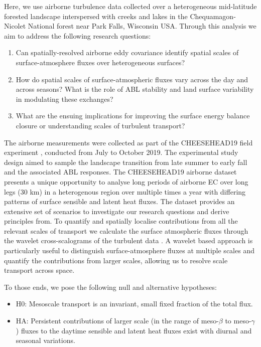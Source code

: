 \documentclass[draft]{agujournal2019}
\begin{document}
Here, we use airborne turbulence data collected over a heterogeneous mid-latitude forested landscape interspersed with creeks and lakes in the Chequamagon-Nicolet National forest near Park Falls, Wisconsin USA.  Through this analysis we aim to address the following research questions:
\begin{enumerate}
    \item Can spatially-resolved airborne eddy covariance identify spatial scales of surface-atmosphere fluxes over heterogeneous surfaces?
    \item How do spatial scales of surface-atmospheric fluxes vary across the day and across seasons? What is the role of ABL stability and land surface variability in modulating these exchanges?
    \item What are the ensuing  implications for improving the surface energy balance closure or understanding scales of turbulent transport?
\end{enumerate}

The airborne measurements were collected as part of the CHEESEHEAD19 field experiment \cite{butterworth_connecting_nodate}, conducted from July to October 2019.  The experimental study design aimed to sample the landscape transition from late summer to early fall and the associated ABL responses.  The CHEESEHEAD19 airborne dataset presents a unique opportunity to analyse long periods of airborne EC over long legs (30 km) in a heterogenous region over multiple times a year with differing patterns of surface sensible and latent heat fluxes.  The dataset provides an extensive set of scenarios to investigate our research questions and derive principles from. To quantify and spatially localise contributions from all the relevant scales of transport we calculate the surface atmospheric fluxes through the wavelet cross-scalograms of the turbulent data \cite{strunin_applying_2004, strunin_spectral_2005, mauder_scale_2007, metzger_spatially_2013}. A wavelet based approach is particularly useful to distinguish surface-atmosphere fluxes at multiple scales and quantify the contributions from larger scales, allowing us to resolve scale transport across space.

To those ends, we pose the following  null and alternative hypotheses:
\begin{itemize}
    \item H0: Mesoscale transport is an invariant, small fixed fraction of the total flux.
    \item HA: Persistent contributions of larger scale (in the range of meso-$\beta$ to meso-$\gamma$ ) fluxes to the daytime sensible and latent heat fluxes exist with diurnal and seasonal variations.
\end{itemize}
\end{document}
